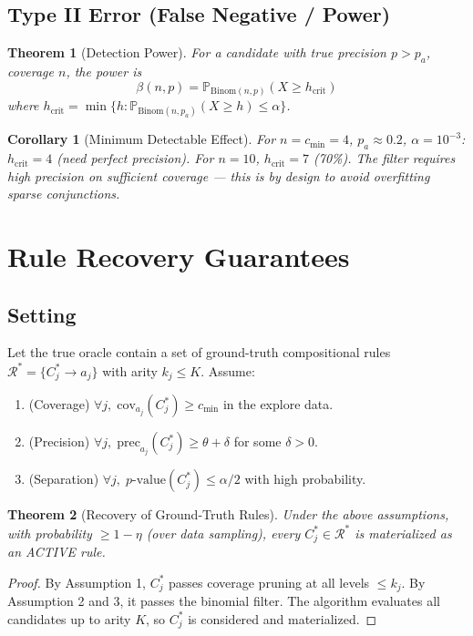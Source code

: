 \documentclass[11pt]{article}
\newcommand{\Prob}{\mathbb{P}}
\newcommand{\Binom}{\mathrm{Binom}}
\newcommand{\calR}{\mathcal{R}}
\newtheorem{theorem}{Theorem}
\newtheorem{corollary}{Corollary}
\begin{document}
\subsection{Type II Error (False Negative / Power)}

\begin{theorem}[Detection Power]
For a candidate with true precision $p > p_a$, coverage $n$, the power is
\[
\beta(n, p) = \Prob_{\Binom(n, p)}(X \geq h_{\text{crit}})
\]
where $h_{\text{crit}} = \min\{h : \Prob_{\Binom(n, p_a)}(X \geq h) \leq \alpha\}$.
\end{theorem}

\begin{corollary}[Minimum Detectable Effect]
For $n = c_{\min} = 4$, $p_a \approx 0.2$, $\alpha=10^{-3}$: $h_{\text{crit}} = 4$ (need perfect precision). For $n=10$, $h_{\text{crit}} = 7$ (70\%). The filter requires \emph{high precision on sufficient coverage} — this is by design to avoid overfitting sparse conjunctions.
\end{corollary}

\section{Rule Recovery Guarantees}

\subsection{Setting}
Let the true oracle contain a set of ground-truth compositional rules $\calR^* = \{C_j^* \to a_j\}$ with arity $k_j \leq K$. Assume:
\begin{enumerate}
    \item (Coverage) $\forall j,\; \mathrm{cov}_{a_j}(C_j^*) \geq c_{\min}$ in the explore data.
    \item (Precision) $\forall j,\; \mathrm{prec}_{a_j}(C_j^*) \geq \theta + \delta$ for some $\delta > 0$.
    \item (Separation) $\forall j,\; p\text{-value}(C_j^*) \leq \alpha/2$ with high probability.
\end{enumerate}

\begin{theorem}[Recovery of Ground-Truth Rules]
Under the above assumptions, with probability $\geq 1 - \eta$ (over data sampling), every $C_j^* \in \calR^*$ is materialized as an ACTIVE rule.
\end{theorem}
\begin{proof}
By Assumption 1, $C_j^*$ passes coverage pruning at all levels $\leq k_j$. By Assumption 2 and 3, it passes the binomial filter. The algorithm evaluates all candidates up to arity $K$, so $C_j^*$ is considered and materialized.
\end{proof}
\end{document}
